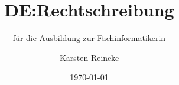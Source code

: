 \documentclass[]{beamer}
\title{DE:Rechtschreibung}
\subtitle{für die Ausbildung zur Fachinformatikerin}
\institute{GS-LDK}
\author{Karsten Reincke}
\date{\today}
\def\cfgGl{../../../cfg.gl/}
\begin{document}

\begin{frame}
  \titlepage
\end{frame}






\logo{}
\newpage




\end{document}
